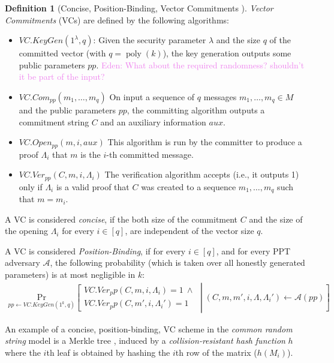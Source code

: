 \documentclass{llncs}
\numberwithin{equation}{section}
\numberwithin{figure}{section}
\theoremstyle{definition}
\newtheorem{definition}[theorem]{Definition}
\newcommand{\Enote}[1]{\textcolor{violet}{Eden: #1}}
\newcommand{\prob}[2]{\ensuremath{\underset{#1}{\text{Pr}}\left [#2\right ]}}
\newcommand{\poly}{\operatorname{poly}}
\newcommand{\Adv}{\ensuremath{\mathcal{A}}}
\begin{document}
\begin{definition} [Concise, Position-Binding, Vector Commitments \cite{catalano2013vector}]
    \emph{Vector Commitments} (VCs) are defined by the following algorithms:
    \begin{itemize}
        \item $VC.KeyGen(1^\lambda, q)$: Given the security parameter $\lambda$ and the size $q$ of the committed vector (with $q = \poly(k)$), the key generation outputs some public parameters $pp$. \Enote{What about the required randomness? shouldn't it be part of the input?}
        \item $VC.Com_{pp}(m_1,\ldots , m_q)$ On input a sequence of $q$ messages $m_1,\ldots, m_q\in M$ and the public parameters $pp$, the committing algorithm outputs a commitment string $C$ and an auxiliary information $aux$.
        \item $VC.Open_{pp}(m, i, aux)$ This algorithm is run by the committer to produce a proof $\Lambda_i$ that $m$ is the $i$-th committed message.
        \item $VC.Ver_{pp}(C, m, i, \Lambda_i)$ The verification algorithm accepts (i.e., it outputs 1) only if $\Lambda_i$ is a valid proof that $C$ was created to a sequence $m_1, \ldots , m_q$ such that $m = m_i$.
    \end{itemize}

    A VC is considered \emph{concise}, if the both size of the commitment $C$ and the size of the opening $\Lambda_i$ for every $i\in [q]$, are independent of the vector size $q$.

    A VC is considered \emph{Position-Binding}, if for every $i\in [q]$, and for every PPT adversary $\Adv$, the following probability (which is taken over all honestly generated parameters) is at most negligible in $k$:
    \begin{gather*}
        \prob{pp \leftarrow VC.KeyGen(1^k, q)}
        {
        \begin{array}{l}
        VC.Ver_pp(C, m, i, \Lambda_i) = 1 \ \wedge \\
        VC.Ver_pp(C, m', i, \Lambda_i') = 1
        \end{array}
        \middle\vert
        (C, m, m', i, \Lambda, \Lambda_i')\leftarrow\Adv(pp)
        }
    \end{gather*}
\end{definition}

An example of a concise, position-binding, VC scheme in the \emph{common random string} model is a Merkle tree \cite{merkle1989certified}, induced by a \emph{collision-resistant hash function} $h$ where the $i$th leaf is obtained by hashing the $i$th row of the matrix ($h(M_i)$).
\end{document}
